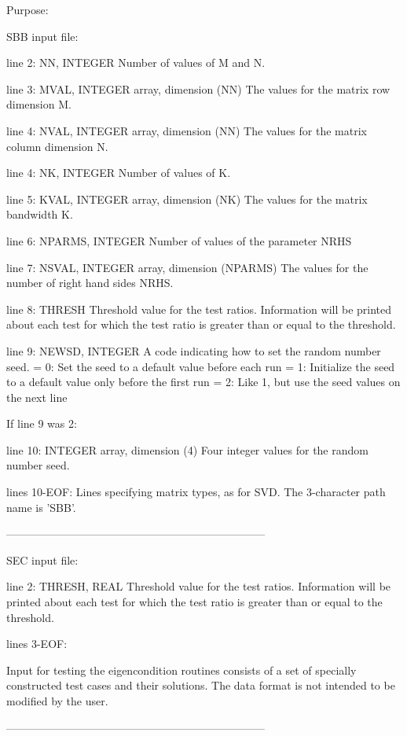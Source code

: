 \begin{DoxyParagraph}{Purpose\+: }
\begin{DoxyVerb}
 SBB input file:

 line 2:  NN, INTEGER
          Number of values of M and N.

 line 3:  MVAL, INTEGER array, dimension (NN)
          The values for the matrix row dimension M.

 line 4:  NVAL, INTEGER array, dimension (NN)
          The values for the matrix column dimension N.

 line 4:  NK, INTEGER
          Number of values of K.

 line 5:  KVAL, INTEGER array, dimension (NK)
          The values for the matrix bandwidth K.

 line 6:  NPARMS, INTEGER
          Number of values of the parameter NRHS

 line 7:  NSVAL, INTEGER array, dimension (NPARMS)
          The values for the number of right hand sides NRHS.

 line 8:  THRESH
          Threshold value for the test ratios.  Information will be
          printed about each test for which the test ratio is greater
          than or equal to the threshold.

 line 9:  NEWSD, INTEGER
          A code indicating how to set the random number seed.
          = 0:  Set the seed to a default value before each run
          = 1:  Initialize the seed to a default value only before the
                first run
          = 2:  Like 1, but use the seed values on the next line

 If line 9 was 2:

 line 10: INTEGER array, dimension (4)
          Four integer values for the random number seed.

 lines 10-EOF:  Lines specifying matrix types, as for SVD.
          The 3-character path name is 'SBB'.

-----------------------------------------------------------------------

 SEC input file:

 line  2: THRESH, REAL
          Threshold value for the test ratios.  Information will be
          printed about each test for which the test ratio is greater
          than or equal to the threshold.

 lines  3-EOF:

 Input for testing the eigencondition routines consists of a set of
 specially constructed test cases and their solutions.  The data
 format is not intended to be modified by the user.

-----------------------------------------------------------------------


\end{DoxyVerb}
\end{DoxyParagraph}
